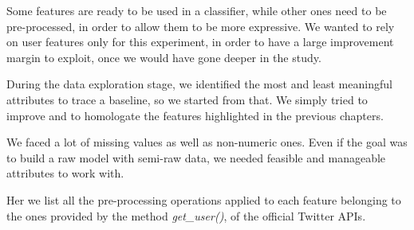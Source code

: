 Some features are ready to be used in a classifier, while other ones need to be pre-processed, in order to allow them to be more expressive.
We wanted to rely on user features only for this experiment, in order to have a large improvement margin to exploit, once we would have gone deeper in the study.

During the data exploration stage, we identified the most and least meaningful attributes to trace a baseline, so we started from that. We simply tried to improve and to homologate the features highlighted in the previous chapters.

We faced a lot of missing values as well as non-numeric ones.
Even if the goal was to build a raw model with semi-raw data, we needed feasible and manageable attributes to work with.

Her we list all the pre-processing operations applied to each feature belonging to the ones provided by the method \textit{get\_user()}, of the official Twitter APIs.
\newpage
\small
